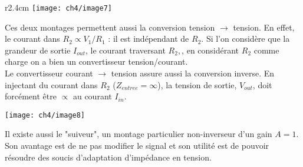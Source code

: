	\begin{wrapfigure}[9]{r}{2.4cm}
	\vspace{-1.2cm}
	\texttt{[image: ch4/image7]}
	\end{wrapfigure}
	Ces deux montages permettent aussi la conversion tension $\rightarrow$ tension. 
	En effet, le courant dans $R_2 \propto V_1/R_1$ : il est 
	indépendant de $R_2$. Si l'on considère que la grandeur de sortie 
	$I_{out}$, le courant traversant $R_2,$, en considérant $R_2$ comme 
	charge on a bien un convertisseur tension/courant.\\
	
	Le convertisseur courant $\rightarrow$ tension assure aussi la conversion inverse. 
	En injectant du courant dans $R_2$ ($Z_{entree}=\infty$), la tension 
	de sortie, $V_{out}$, doit forcément être $\propto$ au courant $I_{in}$.
	
	\begin{center}
		\texttt{[image: ch4/image8]}
	\end{center}
	Il existe aussi le "suiveur", un montage particulier non-inverseur 
	d'un gain $A=1$. Son avantage est de ne pas modifier le signal et son 
	utilité est de pouvoir résoudre des soucis d'adaptation d'impédance en 
	tension.
	
	

